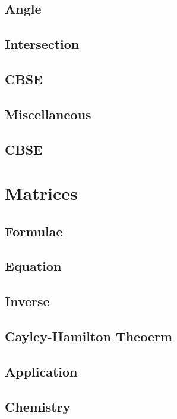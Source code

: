 \documentclass[journal]{IEEEtran}
\begin{document}
\subsection{Angle}

\subsection{Intersection}

\subsection{CBSE}

\subsection{Miscellaneous }

\subsection{CBSE}

\newpage
\section{Matrices}
\subsection{Formulae}

\subsection{Equation}

\subsection{Inverse}

\subsection{Cayley-Hamilton Theoerm}

\subsection{Application}

\subsection{Chemistry}

\newpage
\end{document}
